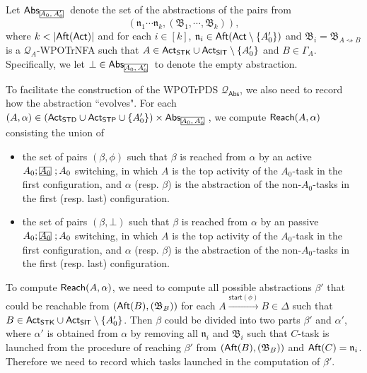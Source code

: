 \documentclass[preprint,12pt]{elsarticle}
\newcommand\rectangled[1]{\tikz[baseline=(torect.base)]{
    \node[shape = rectangle, draw, inner sep=0pt, outer sep = 0pt] (torect) {#1}
    }
}
\newcommand{\mrectangled}[1]{\text{\rectangled{\ensuremath{#1}}}}
\newcommand{\mhcancel}[1]{\mrectangled{#1}}
\newcommand\Qq{{\mathcal{Q} }}
\newcommand\act{{\sf Act}}
\newcommand\aft{{\sf Aft}}
\newcommand\standard{{\sf STD}}
\newcommand\singletop{{\sf STP}}
\newcommand\startactivity{{\mathsf{start} }}
\newcommand\abs{{\mathsf{Abs} }}
\newcommand\aname{\mathfrak{n}}
\newcommand\reach{{\sf Reach}}
\newcommand{\STK}{\mathsf{STK}}
\newcommand{\SIT}{\mathsf{SIT}}
\newcommand\AutB{{\mathfrak{B} }}
\newcommand{\WOTrPDS}{\textsf{WPOTrPDS}}
\newcommand{\WOTrNFA}{\textsf{WPOTrNFA}}
\begin{document}
{Let $\abs_{\mhcancel{A_0,A_0'}}$ denote the set of the abstractions of the pairs from $$(\aname_1\cdots\aname_k,(\AutB_1,\cdots,\AutB_k)),$$ where $k<|\aft(\act)|$ and for each $i\in[k]$, $\aname_i\in\aft(\act\setminus\{A_0'\})$ and $\AutB_i = \AutB_{A\rightsquigarrow B}$ is a $\Qq_{A}$-{\WOTrNFA} such that $A\in\act_{\STK}\cup\act_{\SIT}\setminus\{A_0'\}$ and $B\in\Gamma_A$. Specifically, we let $\bot\in\abs_{\mhcancel{A_0,A_0'}}$ to denote the empty abstraction.

To facilitate the construction of the {\WOTrPDS} $\Qq_{\abs}$, we also need to record how the abstraction ``evolves". For each $(A, \alpha) \in (\act_{\standard}\cup\act_{\singletop}\cup\{A_0'\}) \times \abs_{\mhcancel{A_0,A_0'}}$, 
we compute $\reach(A, \alpha)$ consisting the union of 
\begin{itemize}
    \item the set of pairs $(\beta,\phi)$ such that $\beta$ is reached from $\alpha$ by an active $A_0; \mhcancel{A_0}; A_0$ switching, in which $A$ is the top activity of the $A_0$-task in the first configuration, 
    and $\alpha$ (resp. $\beta$) is the abstraction of the non-$A_0$-tasks in the first (resp. last) configuration.
    \item the set of pairs $(\beta,\bot)$ such that $\beta$ is reached from $\alpha$ by an passive $A_0; \mhcancel{A_0}; A_0$ switching, in which $A$ is the top activity of the $A_0$-task in the first configuration,
    and $\alpha$ (resp. $\beta$) is the abstraction of the non-$A_0$-tasks in the first (resp. last) configuration.
\end{itemize}

To compute $\reach(A,\alpha)$, we need to compute all possible abstractions $\beta'$ that could be reachable from $(\aft(B),(\AutB_{B}))$ for each $A\xrightarrow{\startactivity(\phi)}B\in\Delta$ such that $B\in\act_{\STK}\cup\act_{\SIT}\setminus\{A_0'\}$. Then $\beta$ could be divided into two parts $\beta'$ and $\alpha'$, where $\alpha'$ is obtained from $\alpha$ by removing all $\aname_i$ and $\AutB_i$ such that $C$-task is launched from the procedure of reaching $\beta'$ from $(\aft(B),(\AutB_{B}))$ and $\aft(C) = \aname_i$. Therefore we need to record which tasks launched in the computation of $\beta'$.

}
\end{document}
